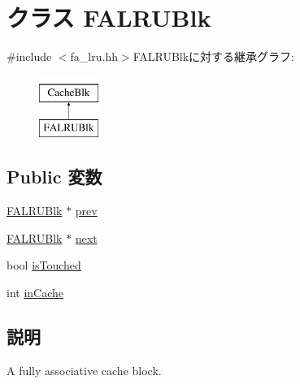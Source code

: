 \hypertarget{classFALRUBlk}{
\section{クラス FALRUBlk}
\label{classFALRUBlk}
}


{\ttfamily \#include $<$fa\_\-lru.hh$>$}FALRUBlkに対する継承グラフ:\begin{figure}[H]
\begin{center}
\leavevmode
\includegraphics[height=2cm]{classFALRUBlk}
\end{center}
\end{figure}
\subsection*{Public 変数}
\begin{DoxyCompactItemize}
\item 
\hyperlink{classFALRUBlk}{FALRUBlk} $\ast$ \hyperlink{classFALRUBlk_a60858281b4339d5562be6944b874b4a3}{prev}
\item 
\hyperlink{classFALRUBlk}{FALRUBlk} $\ast$ \hyperlink{classFALRUBlk_a6052859e7b0dcb984d30d81644b0b0bc}{next}
\item 
bool \hyperlink{classFALRUBlk_a0d3f1758bf7fdcec892f211bf3553d4f}{isTouched}
\item 
int \hyperlink{classFALRUBlk_ac6da16cc60d372d1160776a7dbd19225}{inCache}
\end{DoxyCompactItemize}


\subsection{説明}
A fully associative cache block. 


